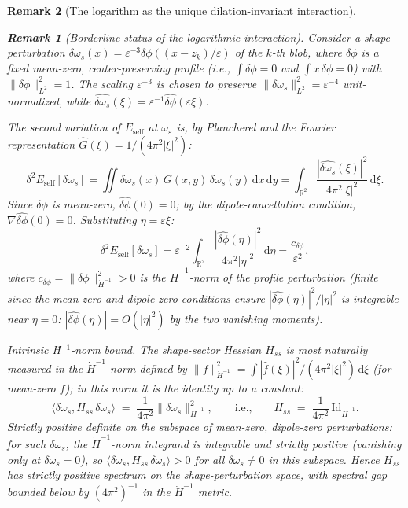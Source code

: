 \documentclass[12pt, a4paper]{article}
\newtheorem{remark}{Remark}[section]
\numberwithin{equation}{section}
\newcommand{\dd}{\mathrm{d}}
\begin{document}
\begin{remark}[The logarithm as the unique dilation-invariant interaction]
\begin{remark}[Borderline status of the logarithmic interaction]
Consider a shape perturbation $\delta\omega_s(x) = \varepsilon^{-3}
\delta\phi((x-z_k)/\varepsilon)$ of the $k$-th blob, where
$\delta\phi$ is a fixed mean-zero, center-preserving profile
(i.e., $\int\delta\phi = 0$ and $\int x\,\delta\phi = 0$) with
$\|\delta\phi\|_{L^2}^2 = 1$.  The scaling $\varepsilon^{-3}$ is
chosen to preserve $\|\delta\omega_s\|_{L^2}^2 = \varepsilon^{-4}$
unit-normalized, while $\hat{\delta\omega_s}(\xi) = \varepsilon^{-1}
\hat{\delta\phi}(\varepsilon\xi)$.

The second variation of $E_{\mathrm{self}}$ at $\omega_\varepsilon$
is, by Plancherel and the Fourier representation
$\hat G(\xi) = 1/(4\pi^2|\xi|^2)$:
\begin{equation}\label{eq:self-energy-Hminus1}
  \delta^2 E_{\mathrm{self}}[\delta\omega_s]
  = \iint\delta\omega_s(x)\,G(x,y)\,\delta\omega_s(y)\,\dd x\,\dd y
  = \int_{\mathbb{R}^2}
    \frac{|\hat{\delta\omega_s}(\xi)|^2}{4\pi^2|\xi|^2}\,\dd\xi.
\end{equation}
Since $\delta\phi$ is mean-zero,
$\hat{\delta\phi}(0) = 0$; by the dipole-cancellation condition,
$\nabla\hat{\delta\phi}(0) = 0$.  Substituting
$\eta = \varepsilon\xi$:
\[
  \delta^2 E_{\mathrm{self}}[\delta\omega_s]
  = \varepsilon^{-2}\int_{\mathbb{R}^2}
    \frac{|\hat{\delta\phi}(\eta)|^2}{4\pi^2|\eta|^2}\,\dd\eta
  = \frac{c_{\delta\phi}}{\varepsilon^2},
\]
where $c_{\delta\phi} = \|\delta\phi\|_{\dot H^{-1}}^2 > 0$ is
the $\dot H^{-1}$-norm of the profile perturbation
(finite since the mean-zero and dipole-zero conditions ensure
$|\hat{\delta\phi}(\eta)|^2/|\eta|^2$ is integrable near
$\eta = 0$: $|\hat{\delta\phi}(\eta)| = O(|\eta|^2)$ by the
two vanishing moments).

\emph{Intrinsic Ḣ$^{-1}$-norm bound.}
The shape-sector Hessian $H_{ss}$ is most naturally measured in
the $\dot H^{-1}$-norm defined by
$\|f\|_{\dot H^{-1}}^2 = \int|\hat f(\xi)|^2/(4\pi^2|\xi|^2)\,\dd\xi$
(for mean-zero $f$); in this norm it is the identity up to
a constant:
\begin{equation}\label{eq:Hss-intrinsic}
  \langle \delta\omega_s, H_{ss}\,\delta\omega_s \rangle
  \;=\; \frac{1}{4\pi^2}\|\delta\omega_s\|_{\dot H^{-1}}^2,
  \qquad\text{i.e.,}\qquad
  H_{ss} \;=\; \frac{1}{4\pi^2}\,\mathrm{Id}_{\dot H^{-1}}.
\end{equation}
\emph{Strictly positive definite} on the subspace of mean-zero,
dipole-zero perturbations: for such $\delta\omega_s$, the
$\dot H^{-1}$-norm integrand is integrable and strictly positive
(vanishing only at $\delta\omega_s = 0$), so
$\langle \delta\omega_s, H_{ss}\,\delta\omega_s \rangle > 0$
for all $\delta\omega_s \ne 0$ in this subspace.  Hence
$H_{ss}$ has strictly positive spectrum on the shape-perturbation
space, with spectral gap bounded below by $(4\pi^2)^{-1}$ in the
$\dot H^{-1}$ metric.


\end{remark}
\end{remark}
\end{document}
